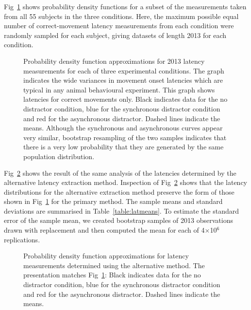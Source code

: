 \documentclass[10pt,letterpaper]{article}
\begin{document}
Fig~\ref{data_density} shows probability density functions for a
subset of the measurements taken from all 55 subjects in the three
conditions. Here, the maximum possible equal number of
correct-movement latency measurements from each condition were
randomly sampled for each subject, giving datasets of length 2013 for
each condition.

\begin{figure}[htb!]
\centering
\caption[Latency measurement PDF] {Probability density function
  approximations for 2013 latency measurements for each of three
  experimental conditions. The graph indicates the wide variances in
  movement onset latencies which are typical in any animal behavioural
  experiment. This graph shows latencies for correct movements
  only. Black indicates data for the no distractor condition, blue for
  the synchronous distractor condition and red for the asynchronous
  distractor. Dashed lines indicate the means. Although the
  synchronous and asynchronous curves appear very similar, bootstrap
  resampling of the two samples indicates that there is a very low
  probability that they are generated by the same population
  distribution.}
\label{data_density}
\end{figure}

Fig~\ref{data_density_alt} shows the result of the same analysis of
the latencies determined by the alternative latency extraction
method. Inspection of Fig~\ref{data_density_alt} shows that the
latency distributions for the alternative extraction method preserve
the form of those shown in Fig~\ref{data_density} for the primary
method. The sample means and standard deviations are summarised in
Table~\ref{table:latmeans}. To estimate the standard error of the
sample mean, we created bootstrap samples of 2013 observations drawn
with replacement and then computed the mean for each of
4$\times$10$^6$ replications.

\begin{figure}[htb!]
\centering
\caption[Latency measurement PDF] {Probability density function
  approximations for latency measurements determined using the
  alternative method. The presentation matches Fig~\ref{data_density}:
  Black indicates data for the no distractor condition, blue for the
  synchronous distractor condition and red for the asynchronous
  distractor. Dashed lines indicate the means.}
\label{data_density_alt}
\end{figure}
\end{document}
